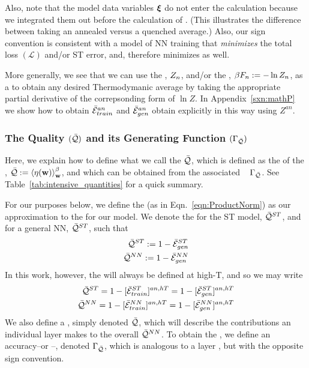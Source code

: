 Also, note that the model data variables $\boldsymbol{\xi}$ do not enter the calculation because we 
integrated them out before the calculation of \ThermalAverage.
(This illustrates the difference between taking an annealed versus a quenched average.)
Also, our sign convention is consistent with a model of NN training that \emph{minimizes} the total loss
$(\mathcal{L})$ and/or ST error, and, therefore minimizes \FreeEnergies as well.

More generally, we see that we can use the \PartitionFunction, $Z_{n}$,
and/or the \FreeEnergy, $\beta F_{n}:=-\ln Z_{n}$, as a \GeneratingFunction to obtain any
desired Thermodymanic average by taking the appropriate partial derivative
of the correpsonding form of $\ln Z$.
In Appendix~\ref{sxn:mathP} we show how to obtain 
$\bar{\mathcal{E}}_{train}^{an}$ and $\bar{\mathcal{E}}_{gen}^{an}$ obtain explicitly in this way using $Z^{an}$.



\subsubsection{The Quality \texorpdfstring{$(\bar{\mathcal{Q}})$}{Q} and its Generating Function \texorpdfstring{$(\Gamma_{\bar{\mathcal{Q}}})$}{(Gamma Q)}}
Here, we explain how to define what we call the \Quality $\bar{\mathcal{Q}}$, which is
defined as the \ThermalAverage of the \SelfOverlap,  $\bar{\mathcal{Q}}:=\left\langle \eta({\mathbf{w}}) \right\rangle_{\mathbf w}^{\beta}$,
and which can be obtained from the associated \emph{\Quality~\GeneratingFunction} $\Gamma_{\bar{\mathcal{Q}}}$.
See Table~\ref{tab:intensive_quantities} for a quick summary.


For our purposes below, we define the \ModelQuality (as in Eqn.~\ref{eqn:ProductNorm}) as our approximation to the
\AverageGeneralizationAccuracy for our model. 
We denote the \ModelQuality for the ST \Perceptron model, $\bar{\mathcal{Q}}^{ST}$,
and for a general NN, $\bar{\mathcal{Q}}^{ST}$, such that
\begin{align}
  \label{eqn:model_pre_qualities}
\bar{\mathcal{Q}}^{ST}:=1-\bar{\mathcal{E}}_{gen}^{ST}  \\ 
\bar{\mathcal{Q}}^{NN}:=1-\bar{\mathcal{E}}_{gen}^{NN}  
\end{align}
In this work, however, the \Quality will always be defined at high-T, and so we may write
\begin{align}
  \label{eqn:model_qualities}
  \bar{\mathcal{Q}}^{ST}=1-[\bar{\mathcal{E}}_{train}^{ST}]^{an,hT}=1-[\bar{\mathcal{E}}_{gen}^{ST}]^{an,hT} \\
  \bar{\mathcal{Q}}^{NN}=1-[\bar{\mathcal{E}}_{train}^{NN}]^{an,hT}=1-[\bar{\mathcal{E}}_{gen}^{NN}]^{an,hT} 
\end{align}
We also define a \LayerQuality, simply denoted $\bar{\mathcal{Q}}$,
which will describe the contributions an individual layer makes to the overall \ModelQuality $\bar{\mathcal{Q}}^{NN}$.
To obtain the \LayerQuality, we define an accuracy--or \Quality--\GeneratingFunction, denoted $\Gamma_{\bar{\mathcal{Q}}}$, which
is analogous to a layer \FreeEnergy, but with the opposite sign convention.


